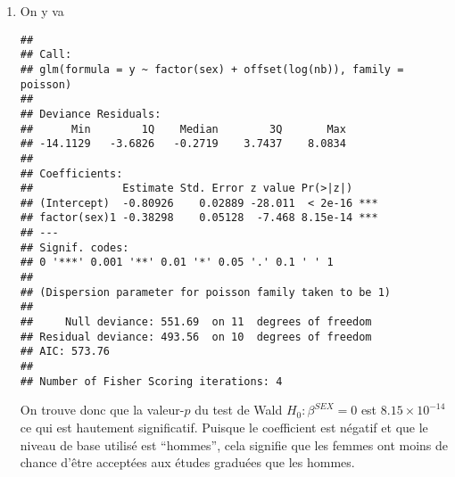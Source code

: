 \begin{solution}{6.5}
\begin{enumerate}
\item On y va
\begin{knitrout}
\color{fgcolor}\begin{kframe}
\begin{alltt}
 \hlkwb{<-} \hlstd{(}\hlopt{:}\hlstd{,}\hlstd{=}\hlstd{)}
 \hlkwb{<-} \hlstd{(}\hlopt{:}\hlstd{,}\hlstd{)}
 \hlkwb{<-} \hlstd{(}\hlstd{,}\hlstd{,}\hlstd{,}\hlstd{,}\hlstd{,}\hlstd{,}\hlstd{,}\hlstd{,}\hlstd{,}\hlstd{,}\hlstd{,}\hlstd{)}
 \hlkwb{<-} \hlstd{(}\hlstd{,}\hlstd{,}\hlstd{,}\hlstd{,}\hlstd{,}\hlstd{,}\hlstd{,}\hlstd{,}\hlstd{,}\hlstd{,}\hlstd{,}\hlstd{)}
 \hlkwb{<-} \hlopt{+}
 \hlkwb{<-} \hlopt{~}\hlopt{+}\hlstd{(}
\end{alltt}
\begin{verbatim}
##
## Call:
## glm(formula = y ~ factor(sex) + offset(log(nb)), family = poisson)
##
## Deviance Residuals:
##      Min        1Q    Median        3Q       Max
## -14.1129   -3.6826   -0.2719    3.7437    8.0834
##
## Coefficients:
##              Estimate Std. Error z value Pr(>|z|)
## (Intercept)  -0.80926    0.02889 -28.011  < 2e-16 ***
## factor(sex)1 -0.38298    0.05128  -7.468 8.15e-14 ***
## ---
## Signif. codes:
## 0 '***' 0.001 '**' 0.01 '*' 0.05 '.' 0.1 ' ' 1
##
## (Dispersion parameter for poisson family taken to be 1)
##
##     Null deviance: 551.69  on 11  degrees of freedom
## Residual deviance: 493.56  on 10  degrees of freedom
## AIC: 573.76
##
## Number of Fisher Scoring iterations: 4
\end{verbatim}
\end{kframe}
\end{knitrout}

On trouve donc que la valeur-$p$ du test de Wald $H_0: \beta^{SEX}=0$ est $8.15\times10^{-14}$ ce qui est hautement significatif. Puisque le coefficient est négatif et que le niveau de base utilisé est ``hommes'', cela signifie que les femmes ont moins de chance d'être acceptées aux études graduées que les hommes.


\end{enumerate}
\end{solution}
